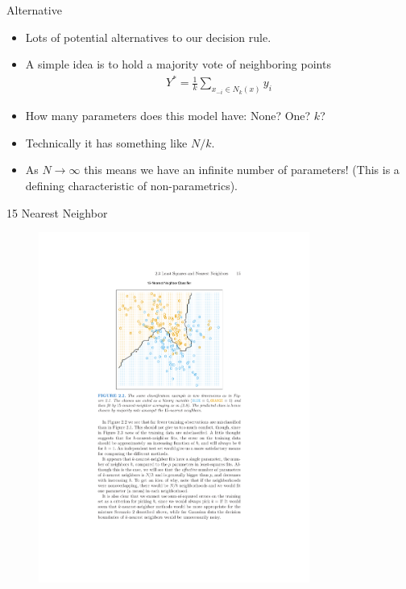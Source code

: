 \begin{frame}{Alternative}
\begin{itemize}
\item Lots of potential alternatives to our decision rule.
\item A simple idea is to hold a majority vote of neighboring points 
\begin{eqnarray*}
Y^{*} = \frac{1}{k} \sum_{x_{-i} \in N_k(x)} y_i
\end{eqnarray*}
\item How many parameters does this model have: None? One? $k$? 
\item Technically it has something like $N/k$.
\item As $N \rightarrow \infty$ this means we have an infinite number of parameters! (This is a defining characteristic of non-parametrics).
\end{itemize}
\end{frame}

\begin{frame}{15 Nearest Neighbor}
  \vspace{-15pt}
\begin{figure}[htbp]
\begin{center}
\includegraphics[width=3.5in]{./resources/classifier15nn.pdf}
\label{class15nn}
\end{center}
\end{figure}
\end{frame}

